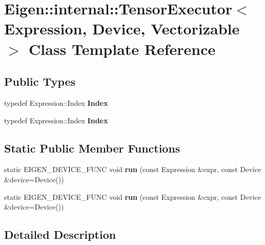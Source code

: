 \hypertarget{class_eigen_1_1internal_1_1_tensor_executor}{}\section{Eigen\+:\+:internal\+:\+:Tensor\+Executor$<$ Expression, Device, Vectorizable $>$ Class Template Reference}
\label{class_eigen_1_1internal_1_1_tensor_executor}
\subsection*{Public Types}
\begin{DoxyCompactItemize}
\item 
\mbox{\label{class_eigen_1_1internal_1_1_tensor_executor_aae209bfff57548530837db0e6d100932}} 
typedef Expression\+::\+Index {\bfseries Index}
\item 
\mbox{\label{class_eigen_1_1internal_1_1_tensor_executor_aae209bfff57548530837db0e6d100932}} 
typedef Expression\+::\+Index {\bfseries Index}
\end{DoxyCompactItemize}
\subsection*{Static Public Member Functions}
\begin{DoxyCompactItemize}
\item 
\mbox{\label{class_eigen_1_1internal_1_1_tensor_executor_a2746f3ea9258215fe221288ec352c0bc}} 
static E\+I\+G\+E\+N\+\_\+\+D\+E\+V\+I\+C\+E\+\_\+\+F\+U\+NC void {\bfseries run} (const Expression \&expr, const Device \&device=Device())
\item 
\mbox{\label{class_eigen_1_1internal_1_1_tensor_executor_a2746f3ea9258215fe221288ec352c0bc}} 
static E\+I\+G\+E\+N\+\_\+\+D\+E\+V\+I\+C\+E\+\_\+\+F\+U\+NC void {\bfseries run} (const Expression \&expr, const Device \&device=Device())
\end{DoxyCompactItemize}


\subsection{Detailed Description}
